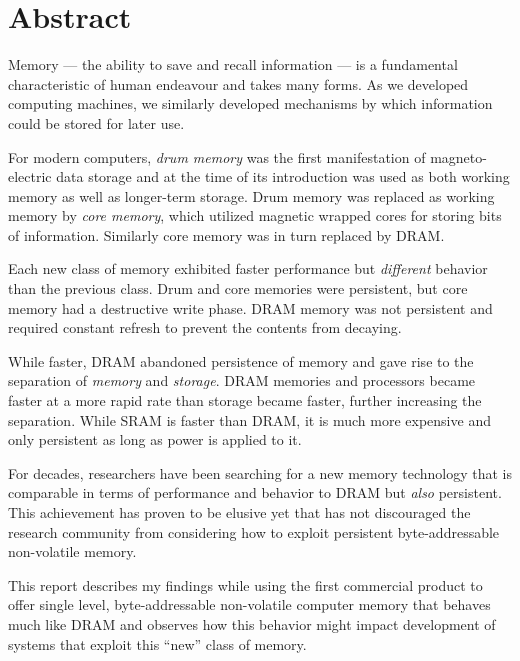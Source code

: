 
\chapter{Abstract}

Memory --- the ability to save and recall information --- is a fundamental
characteristic of human endeavour and takes many forms.  As we developed
computing machines, we similarly developed mechanisms by which information
could be stored for later use.

For modern computers, \textit{drum memory} was the first manifestation of
magneto-electric data storage and at the time of its introduction was used
as both working memory as well as longer-term storage.  Drum memory was
replaced as working memory by \textit{core memory}, which utilized magnetic
wrapped cores for storing bits of information.  Similarly core memory was
in turn replaced by \acs{DRAM}.  

Each new class of memory exhibited faster performance but \textit{different} 
behavior than the previous class.  Drum and core memories were persistent,
but core memory had a destructive write phase.  \acs{DRAM} memory was not
persistent and required constant refresh to prevent the contents from
decaying.

While faster, \acs{DRAM} abandoned persistence of memory and gave rise to the
separation of \textit{memory} and \textit{storage}.  \acs{DRAM} memories and
processors became faster at a more rapid rate than storage became faster,
further increasing the separation.  While \acs{SRAM}
is faster than \acs{DRAM}, it is much more expensive and only persistent as long as
power is applied to it.

For decades, researchers have been searching for a new memory technology 
that is comparable in terms of performance and behavior to DRAM but
\textit{also} persistent.  This achievement has proven to be elusive yet
that has not discouraged the research community from considering how
to exploit persistent byte-addressable non-volatile memory.

This report describes my findings while using the first commercial product
to offer single level, byte-addressable non-volatile computer memory that behaves much like
\acs{DRAM} and observes how this behavior might impact development of
systems that exploit this ``new'' class of memory.

\vfill
\begin{center}
\begin{sf}
\end{sf}
\end{center}
